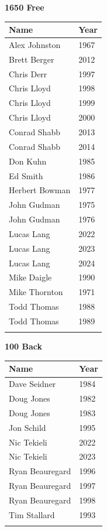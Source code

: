 \noindent\begin{minipage}[t]{0.48\textwidth}
\centering
\textbf{\textcolor{teamprimary}{1650 Free}}\par
\vspace{0.5em}
\centering
\small
\renewcommand{\arraystretch}{1.0}
\setlength{\tabcolsep}{4pt}
\begin{tabular}{@{}p{3.0cm}p{1.0cm}@{}}
\toprule
\textbf{Name} & \textbf{Year} \\
\midrule
Alex Johnston & 1967 \\
Brett Berger & 2012 \\
Chris Derr & 1997 \\
Chris Lloyd & 1998 \\
Chris Lloyd & 1999 \\
Chris Lloyd & 2000 \\
Conrad Shabb & 2013 \\
Conrad Shabb & 2014 \\
Don Kuhn & 1985 \\
Ed Smith & 1986 \\
Herbert Bowman & 1977 \\
John Gudman & 1975 \\
John Gudman & 1976 \\
Lucas Lang & 2022 \\
Lucas Lang & 2023 \\
Lucas Lang & 2024 \\
Mike Daigle & 1990 \\
Mike Thornton & 1971 \\
Todd Thomas & 1988 \\
Todd Thomas & 1989 \\
\bottomrule
\vspace{0.5em}
\end{tabular}
\end{minipage}
\hfill
\begin{minipage}[t]{0.48\textwidth}
\centering
\textbf{\textcolor{teamprimary}{100 Back}}\par
\vspace{0.5em}
\centering
\small
\renewcommand{\arraystretch}{1.0}
\setlength{\tabcolsep}{4pt}
\begin{tabular}{@{}p{3.0cm}p{1.0cm}@{}}
\toprule
\textbf{Name} & \textbf{Year} \\
\midrule
Dave Seidner & 1984 \\
Doug Jones & 1982 \\
Doug Jones & 1983 \\
Jon Schild & 1995 \\
Nic Tekieli & 2022 \\
Nic Tekieli & 2023 \\
Ryan Beauregard & 1996 \\
Ryan Beauregard & 1997 \\
Ryan Beauregard & 1998 \\
Tim Stallard & 1993 \\
\bottomrule
\vspace{0.5em}
\end{tabular}
\end{minipage}
